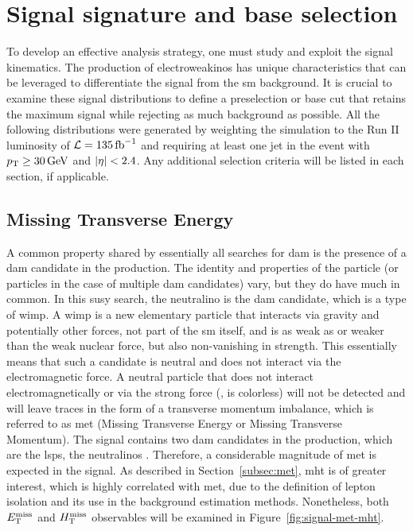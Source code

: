 \clearpage
\section{Signal signature and base selection}
\label{sec:signal-signature}

To develop an effective analysis strategy, one must study and exploit the signal kinematics. The production of electroweakinos has unique characteristics that can be leveraged to differentiate the signal from the \gls{sm} background. It is crucial to examine these signal distributions to define a preselection or base cut that retains the maximum signal while rejecting as much background as possible. All the following distributions were generated by weighting the simulation to the Run II luminosity of $\mathcal{L} = 135 \mbox{\ensuremath{\,\text{fb}^{-1}}}$ and requiring at least one jet in the event with $p_{\mathrm{T}} \geq 30\,\text{Ge\hspace{-.08em}V}$ and $\lvert \eta \rvert<2.4$. Any additional selection criteria will be listed in each section, if applicable.

\subsection{Missing Transverse Energy}
\label{subsec:signal-met-mht}

A common property shared by essentially all searches for \gls{dam} is the presence of a \gls{dam} candidate in the production. The identity and properties of the particle (or particles in the case of multiple \gls{dam} candidates) vary, but they do have much in common. In this \gls{susy} search, the \gls{neutralino} is the \gls{dam} candidate, which is a type of \gls{wimp}. A \gls{wimp} is a new elementary particle that interacts via gravity and potentially other forces, not part of the \gls{sm} itself, and is as weak as or weaker than the weak nuclear force, but also non-vanishing in strength. This essentially means that such a candidate is neutral and does not interact via the electromagnetic force. A neutral particle that does not interact electromagnetically or via the strong force (\ie, is colorless) will not be detected and will leave traces in the form of a transverse momentum imbalance, which is referred to as \gls{met} (Missing Transverse Energy or Missing Transverse Momentum). The signal contains two \gls{dam} candidates in the production, which are the \glspl{lsp}, the \glspl{neutralino} \neuto. Therefore, a considerable magnitude of \gls{met} is expected in the signal. As described in Section~\ref{subsec:met}, \gls{mht} is of greater interest, which is highly correlated with \gls{met}, due to the definition of lepton isolation and its use in the background estimation methods. Nonetheless, both $E_{\mathrm{T}}^{\text{miss}}$ and $H_{\mathrm{T}}^{\text{miss}}$ observables will be examined in Figure~\ref{fig:signal-met-mht}.


